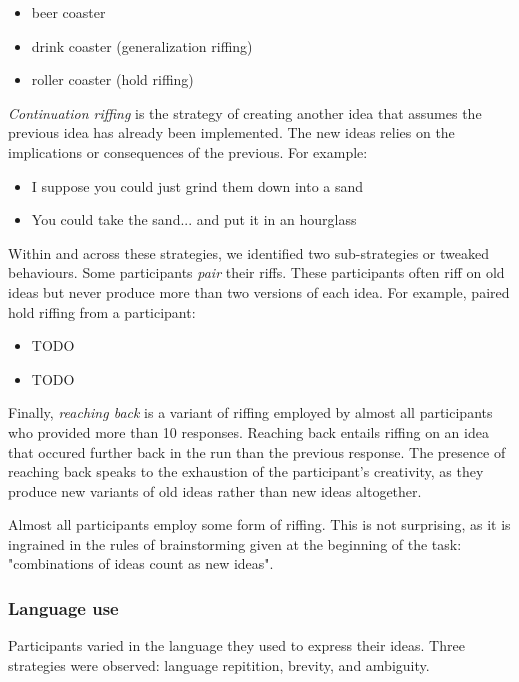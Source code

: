 \begin{itemize}
    \item beer coaster
    \item drink coaster (generalization riffing)
    \item roller coaster (hold riffing)
\end{itemize}

\emph{Continuation riffing} is the strategy of creating another idea that assumes the previous idea has already been implemented. The new ideas relies on the implications or consequences of the previous. For example:

\begin{itemize}
    \item I suppose you could just grind them down into a sand
    \item You could take the sand... and put it in an hourglass
\end{itemize}


Within and across these strategies, we identified two sub-strategies or tweaked behaviours.
Some participants \emph{pair} their riffs. These participants  often riff on old ideas but never produce more than two versions of each idea. For example, paired hold riffing from a participant:

\begin{itemize}
\item TODO
\item TODO
\end{itemize}

Finally, \emph{reaching back} is a variant of riffing employed by almost all participants who provided more than 10 responses. Reaching back entails riffing on an idea that occured further back in the run than the previous response. The presence of reaching back speaks to the exhaustion of the participant's creativity, as they produce new variants of old ideas rather than new ideas altogether.

Almost all participants employ some form of riffing. This is not surprising, as it is ingrained in the rules of brainstorming given at the beginning of the task: "combinations of ideas count as new ideas". 

\subsubsection{Language use}

Participants varied in the language they used to express their ideas. Three strategies were observed: language repitition, brevity, and ambiguity.

